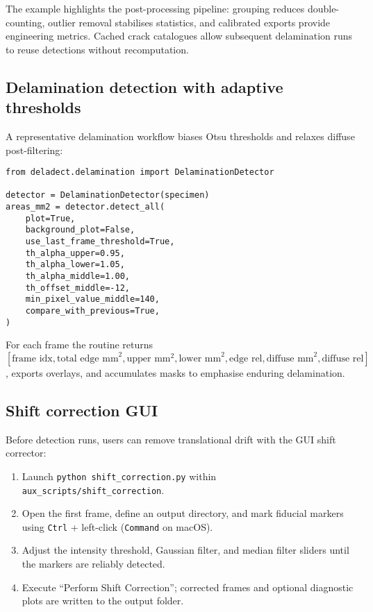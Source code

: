 \documentclass[preprint,12pt,a4paper]{elsarticle}
\begin{document}
The example highlights the post-processing pipeline: grouping reduces double-counting, outlier removal
stabilises statistics, and calibrated exports provide engineering metrics. Cached crack catalogues allow
subsequent delamination runs to reuse detections without recomputation.

\subsection{Delamination detection with adaptive thresholds}
A representative delamination workflow biases Otsu thresholds and relaxes diffuse post-filtering:

\begin{verbatim}
from deladect.delamination import DelaminationDetector

detector = DelaminationDetector(specimen)
areas_mm2 = detector.detect_all(
    plot=True,
    background_plot=False,
    use_last_frame_threshold=True,
    th_alpha_upper=0.95,
    th_alpha_lower=1.05,
    th_alpha_middle=1.00,
    th_offset_middle=-12,
    min_pixel_value_middle=140,
    compare_with_previous=True,
)
\end{verbatim}

For each frame the routine returns
\([\text{frame idx}, \text{total edge mm}^2, \text{upper mm}^2, \text{lower mm}^2, \text{edge rel}, \text{diffuse mm}^2, \text{diffuse rel}]\),
exports overlays, and accumulates masks to emphasise enduring delamination.

\subsection{Shift correction GUI}
Before detection runs, users can remove translational drift with the GUI shift corrector:

\begin{enumerate}
    \item Launch \texttt{python shift\_correction.py} within
    \texttt{aux\_scripts/shift\_correction}.
    \item Open the first frame, define an output directory, and mark fiducial markers using
    \texttt{Ctrl} + left-click (\texttt{Command} on macOS).
    \item Adjust the intensity threshold, Gaussian filter, and median filter sliders until the markers
    are reliably detected.
    \item Execute ``Perform Shift Correction''; corrected frames and optional diagnostic plots are
    written to the output folder.
\end{enumerate}
\end{document}
